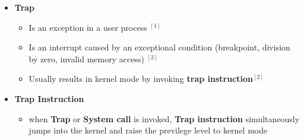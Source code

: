 \documentclass[12pt]{article}
\begin{document}
\begin{enumerate}[1.]
\begin{enumerate}[a)]
        \begin{itemize}
            \item \textbf{Trap}
            \begin{itemize}
                \item Is an exception in a user process $^{[1]}$
                \item Is an interrupt caused by an exceptional condition (breakpoint, division by zero, invalid memory access) $^{[2]}$
                \item Usually results in kernel mode by invoking \textbf{trap instruction}$^{[2]}$
            \end{itemize}

            \item \textbf{Trap Instruction}

            \begin{itemize}
                \item when \textbf{Trap} or \textbf{System call} is invoked, \textbf{Trap instruction}
                simultaneously jumps into the kernel and raise the previlege
                level to kernel mode
            \end{itemize}
        \end{itemize}

    \end{enumerate}





\end{enumerate}
\end{document}
